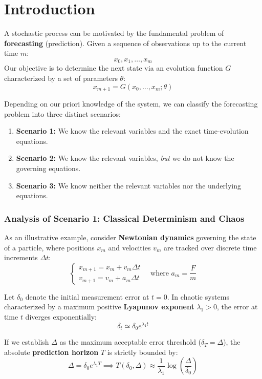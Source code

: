\chapter{Introduction}


A stochastic process can be motivated by the fundamental problem of \textbf{forecasting} (prediction). Given a sequence of observations up to the current time $m$:
\[
x_0, x_1, \dots, x_m
\]
Our objective is to determine the next state via an evolution function $G$ characterized by a set of parameters $\theta$:
\[
x_{m+1} = G(x_0, \dots, x_m; \theta)
\]

Depending on our priori knowledge of the system, we can classify the forecasting problem into three distinct scenarios:
\begin{enumerate}
    \item \textbf{Scenario 1:} We know the relevant variables and the exact time-evolution equations.
    \item \textbf{Scenario 2:} We know the relevant variables, \textit{but} we do not know the governing equations.
    \item \textbf{Scenario 3:} We know neither the relevant variables nor the underlying equations.
\end{enumerate}

\subsection*{Analysis of Scenario 1: Classical Determinism and Chaos}

As an illustrative example, consider \textbf{Newtonian dynamics} governing the state of a particle, where positions $x_m$ and velocities $v_m$ are tracked over discrete time increments $\Delta t$:
\begin{equation*}
    \begin{cases} 
        x_{m+1} = x_m + v_m \Delta t \\ 
        v_{m+1} = v_m + a_m \Delta t 
    \end{cases}
    \quad \text{where } a_m = \frac{F}{m}
\end{equation*}



Let $\delta_0$ denote the initial measurement error at $t = 0$. In chaotic systems characterized by a maximum positive \textbf{Lyapunov exponent} $\lambda_1 > 0$, the error at time $t$ diverges exponentially:
\[
\delta_t \simeq \delta_0 e^{\lambda_1 t}
\]

If we establish $\Delta$ as the maximum acceptable error threshold ($\delta_T = \Delta$), the absolute \textbf{prediction horizon} $T$ is strictly bounded by:
\[
\Delta = \delta_0 e^{\lambda_1 T} \implies T(\delta_0, \Delta) \approx \frac{1}{\lambda_1} \log \left( \frac{\Delta}{\delta_0} \right)
\]

